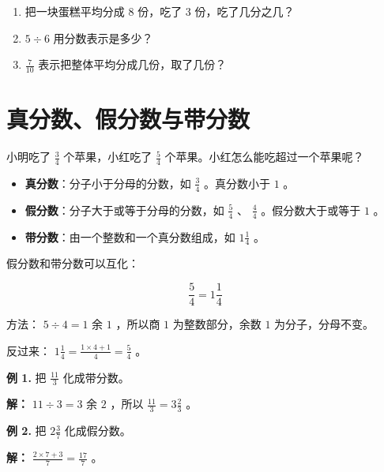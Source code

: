 \begin{practice}


\begin{enumerate}
  \item 把一块蛋糕平均分成 $8$ 份，吃了 $3$ 份，吃了几分之几？
  \item $5 \div 6$ 用分数表示是多少？
  \item $\frac{7}{10}$ 表示把整体平均分成几份，取了几份？
\end{enumerate}


\end{practice}

\section*{真分数、假分数与带分数}


\begin{explore}


小明吃了 $\frac{3}{4}$ 个苹果，小红吃了 $\frac{5}{4}$ 个苹果。小红怎么能吃超过一个苹果呢？

\end{explore}

\begin{understand}


\begin{itemize}
  \item \textbf{真分数}：分子小于分母的分数，如 $\frac{3}{4}$ 。真分数小于 $1$ 。
  \item \textbf{假分数}：分子大于或等于分母的分数，如 $\frac{5}{4}$ 、 $\frac{4}{4}$ 。假分数大于或等于 $1$ 。
  \item \textbf{带分数}：由一个整数和一个真分数组成，如 $1\frac{1}{4}$ 。
\end{itemize}


假分数和带分数可以互化：

\[
\frac{5}{4} = 1\frac{1}{4}
\]


方法： $5 \div 4 = 1$ 余 $1$ ，所以商 $1$ 为整数部分，余数 $1$ 为分子，分母不变。

反过来： $1\frac{1}{4} = \frac{1 \times 4 + 1}{4} = \frac{5}{4}$ 。

\end{understand}

\begin{workedexamples}


\textbf{例 1.} 把 $\frac{11}{3}$ 化成带分数。

\textbf{解：} $11 \div 3 = 3$ 余 $2$ ，所以 $\frac{11}{3} = 3\frac{2}{3}$ 。

\textbf{例 2.} 把 $2\frac{3}{7}$ 化成假分数。

\textbf{解：} $\frac{2 \times 7 + 3}{7} = \frac{17}{7}$ 。

\end{workedexamples}

